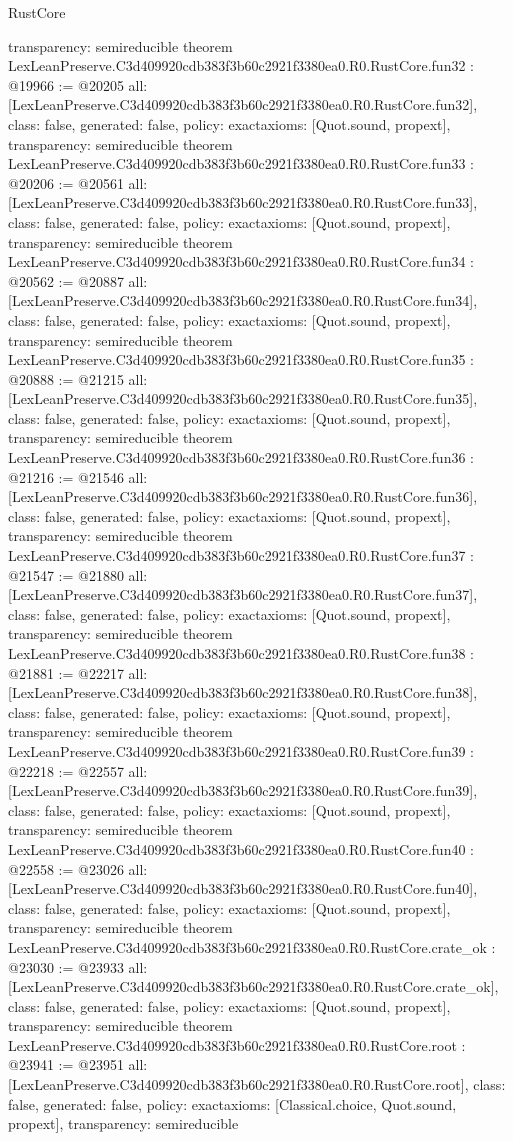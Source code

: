 \begin{lexlean}{RustCore}
\begin{coremodule}
{  transparency: semireducible
}
theorem LexLeanPreserve.C3d409920cdb383f3b60c2921f3380ea0.R0.RustCore.fun32 : @19966 := @20205 {
  all: [LexLeanPreserve.C3d409920cdb383f3b60c2921f3380ea0.R0.RustCore.fun32],
  class: false,
  generated: false,
  policy: exact{axioms: [Quot.sound, propext]},
  transparency: semireducible
}
theorem LexLeanPreserve.C3d409920cdb383f3b60c2921f3380ea0.R0.RustCore.fun33 : @20206 := @20561 {
  all: [LexLeanPreserve.C3d409920cdb383f3b60c2921f3380ea0.R0.RustCore.fun33],
  class: false,
  generated: false,
  policy: exact{axioms: [Quot.sound, propext]},
  transparency: semireducible
}
theorem LexLeanPreserve.C3d409920cdb383f3b60c2921f3380ea0.R0.RustCore.fun34 : @20562 := @20887 {
  all: [LexLeanPreserve.C3d409920cdb383f3b60c2921f3380ea0.R0.RustCore.fun34],
  class: false,
  generated: false,
  policy: exact{axioms: [Quot.sound, propext]},
  transparency: semireducible
}
theorem LexLeanPreserve.C3d409920cdb383f3b60c2921f3380ea0.R0.RustCore.fun35 : @20888 := @21215 {
  all: [LexLeanPreserve.C3d409920cdb383f3b60c2921f3380ea0.R0.RustCore.fun35],
  class: false,
  generated: false,
  policy: exact{axioms: [Quot.sound, propext]},
  transparency: semireducible
}
theorem LexLeanPreserve.C3d409920cdb383f3b60c2921f3380ea0.R0.RustCore.fun36 : @21216 := @21546 {
  all: [LexLeanPreserve.C3d409920cdb383f3b60c2921f3380ea0.R0.RustCore.fun36],
  class: false,
  generated: false,
  policy: exact{axioms: [Quot.sound, propext]},
  transparency: semireducible
}
theorem LexLeanPreserve.C3d409920cdb383f3b60c2921f3380ea0.R0.RustCore.fun37 : @21547 := @21880 {
  all: [LexLeanPreserve.C3d409920cdb383f3b60c2921f3380ea0.R0.RustCore.fun37],
  class: false,
  generated: false,
  policy: exact{axioms: [Quot.sound, propext]},
  transparency: semireducible
}
theorem LexLeanPreserve.C3d409920cdb383f3b60c2921f3380ea0.R0.RustCore.fun38 : @21881 := @22217 {
  all: [LexLeanPreserve.C3d409920cdb383f3b60c2921f3380ea0.R0.RustCore.fun38],
  class: false,
  generated: false,
  policy: exact{axioms: [Quot.sound, propext]},
  transparency: semireducible
}
theorem LexLeanPreserve.C3d409920cdb383f3b60c2921f3380ea0.R0.RustCore.fun39 : @22218 := @22557 {
  all: [LexLeanPreserve.C3d409920cdb383f3b60c2921f3380ea0.R0.RustCore.fun39],
  class: false,
  generated: false,
  policy: exact{axioms: [Quot.sound, propext]},
  transparency: semireducible
}
theorem LexLeanPreserve.C3d409920cdb383f3b60c2921f3380ea0.R0.RustCore.fun40 : @22558 := @23026 {
  all: [LexLeanPreserve.C3d409920cdb383f3b60c2921f3380ea0.R0.RustCore.fun40],
  class: false,
  generated: false,
  policy: exact{axioms: [Quot.sound, propext]},
  transparency: semireducible
}
theorem LexLeanPreserve.C3d409920cdb383f3b60c2921f3380ea0.R0.RustCore.crate_ok : @23030 := @23933 {
  all: [LexLeanPreserve.C3d409920cdb383f3b60c2921f3380ea0.R0.RustCore.crate_ok],
  class: false,
  generated: false,
  policy: exact{axioms: [Quot.sound, propext]},
  transparency: semireducible
}
theorem LexLeanPreserve.C3d409920cdb383f3b60c2921f3380ea0.R0.RustCore.root : @23941 := @23951 {
  all: [LexLeanPreserve.C3d409920cdb383f3b60c2921f3380ea0.R0.RustCore.root],
  class: false,
  generated: false,
  policy: exact{axioms: [Classical.choice, Quot.sound, propext]},
  transparency: semireducible
}


\end{coremodule}
\end{lexlean}
